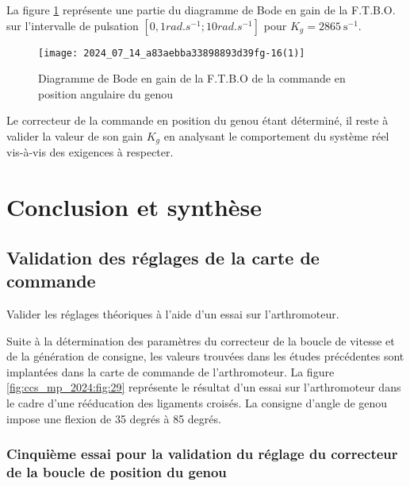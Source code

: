 La figure \ref{fig:ccs_mp_2024:fig:27} représente une partie du diagramme de Bode en gain de la F.T.B.O. sur l'intervalle de pulsation $\left[0,1 \si{rad.s^{-1}} ; 10 \si{rad.s^{-1}}\right]$ pour $K_{g}=2865 \mathrm{~s}^{-1}$.



\begin{figure}[!h]\centering
\texttt{[image: 2024\_07\_14\_a83aebba33898893d39fg-16(1)]}

\caption{\label{fig:ccs_mp_2024:fig:27}Diagramme de Bode en gain de la F.T.B.O de la commande en position angulaire du genou}
\end{figure}

Le correcteur de la commande en position du genou étant déterminé, il reste à valider la valeur de son gain $K_{g}$ en analysant le comportement du système réel vis-à-vis des exigences à respecter.

\section{Conclusion et synthèse}
\subsection{Validation des réglages de la carte de commande}

\begin{obj}
Valider les réglages théoriques à l'aide d'un essai sur l'arthromoteur.
\end{obj}

Suite à la détermination des paramètres du correcteur de la boucle de vitesse et de la génération de consigne, les valeurs trouvées dans les études précédentes sont implantées dans la carte de commande de l'arthromoteur. La figure \ref{fig:ccs_mp_2024:fig:29} représente le résultat d'un essai sur l'arthromoteur dans le cadre d'une rééducation des ligaments croisés. La consigne d'angle de genou impose une flexion de 35 degrés à 85 degrés.

\subsubsection*{Cinquième essai pour la validation du réglage du correcteur de la boucle de position du genou}

